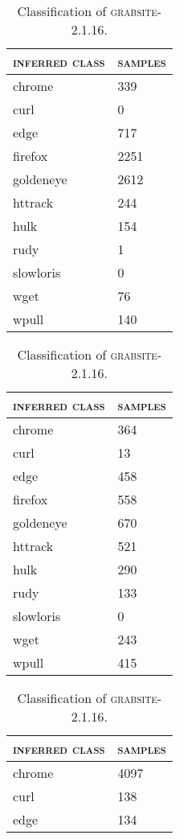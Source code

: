 \begin{table}[H]
	\centering
	\begin{subtable}{.45\linewidth}
		\centering
	\begin{tabular}{ll}
		\toprule
		\textsc{inferred class} & \textsc{samples}\\
		\midrule
		chrome & 339\\
		curl & 0\\
		edge & 717\\
		firefox & 2251\\
		goldeneye & 2612\\
		httrack & 244\\
		hulk & 154\\
		rudy & 1\\
		slowloris & 0\\
		wget & 76\\
		wpull & 140\\
		\bottomrule
	\end{tabular}
	\caption{Classification of \textsc{firefox-68.0}.}
	\end{subtable}
	\begin{subtable}{.45\linewidth}
		\centering
	\begin{tabular}{ll}
		\toprule
		\textsc{inferred class} & \textsc{samples}\\
		\midrule
		chrome & 364\\
		curl & 13\\
		edge & 458\\
		firefox & 558\\
		goldeneye & 670\\
		httrack & 521\\
		hulk & 290\\
		rudy & 133\\
		slowloris & 0\\
		wget & 243\\
		wpull & 415\\
		\bottomrule
	\end{tabular}
	\caption{Classification of \textsc{grabsite-2.1.16}.}
	\end{subtable}
	\begin{subtable}{.45\linewidth}
		\centering
	\begin{tabular}{ll}
		\toprule
		\textsc{inferred class} & \textsc{samples}\\
		\midrule
		chrome & 4097\\
		curl & 138\\
		edge & 134\\

\end{tabular}
\end{subtable}
\end{table}
